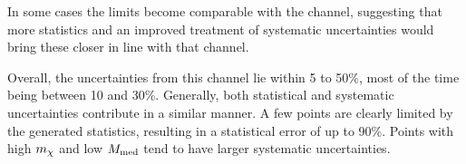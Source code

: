 In some cases the limits become comparable with the \monoZ channel, suggesting that more statistics and an improved treatment of systematic uncertainties would bring these closer in line with that channel.

Overall, the uncertainties from this channel lie within 5 to 50\%, most of the time being between 10 and 30\%. Generally, both statistical and systematic uncertainties contribute in a similar manner. A few points are clearly limited by the generated statistics, resulting in a statistical error of up to 90\%. Points with high $m_{\chi}$ and low $M_{\mathrm{med}}$ tend to have larger systematic uncertainties.

\afterpage{\clearpage}


